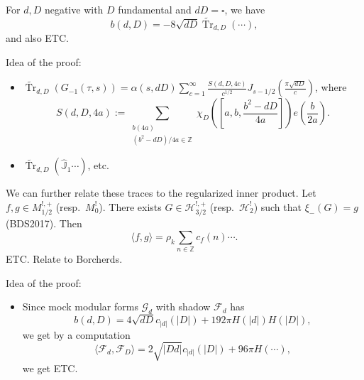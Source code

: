 \documentclass[reqno]{amsart} 
\begin{document}
\begin{theorem}[-, Kumar 2024]
  For $d, D$ negative with $D$ fundamental and $d D = \square$, we have
  \begin{equation*}
    b(d, D) = - 8 \sqrt{d D} \tilde{\operatorname{Tr}}_{d,D}(\dotsb),
  \end{equation*}
  and also ETC.
\end{theorem}

Idea of the proof:
\begin{itemize}
\item $\tilde{\operatorname{Tr}}_{d, D}(G_{- 1}(\tau, s)) = \alpha(s, d D) \sum_{c = 1}^\infty \frac{S(d, D, 4 c)}{c^{1/2}}J_{s - 1/2} \left( \frac{\pi \sqrt{d D}}{c} \right)$, where
  \begin{equation*}
    S(d, D, 4 a)
    := \sum_{
      \substack{
        b (4 a)  \\
        (b^2 - d D) / 4 a \in \mathbb{Z}
      }
    }
    \chi_D \left( \left[ a, b, \frac{b^2 - d D}{4 a} \right] \right)
    e \left( \frac{b}{2 a} \right).
  \end{equation*}
\item $\tilde{\operatorname{Tr}}_{d, D}(\hat{\mathbb{J}}_1 \dotsb)$, etc.
\end{itemize}


We can further relate these traces to the regularized inner product.  Let $f, g \in M_{1/2}^{!, +}$ (resp.\ $M_0 ^!$).  There exists $G \in \mathcal{H}_{3/2}^{!, +}$ (resp.\ $\mathcal{H}_2^!$) such that $\xi_-(G) = g$ (BDS2017).  Then
\begin{equation*}
  \langle f, g \rangle = \rho_k \sum_{n \in \mathbb{Z}} c_f(n) \dotsb.
\end{equation*}
ETC.  Relate to Borcherds.

Idea of the proof:
\begin{itemize}
\item Since mock modular forms $\mathcal{G}_d$ with shadow $\mathcal{F}_d$ has
  \begin{equation*}
    b(d, D) = 4 \sqrt{d D} c_{\lvert d \rvert}(\lvert D \rvert) + 192 \pi H(\lvert d \rvert)
    H(\lvert D \rvert),
  \end{equation*}
  we get by a computation
  \begin{equation*}
    \langle \mathcal{F}_d, \mathcal{F}_D \rangle = 2 \sqrt{\lvert D d \rvert}
    c_{\lvert d \rvert}(\lvert D \rvert) + 96 \pi H(\dotsb),
  \end{equation*}
  we get ETC.
\end{itemize}
\end{document}
